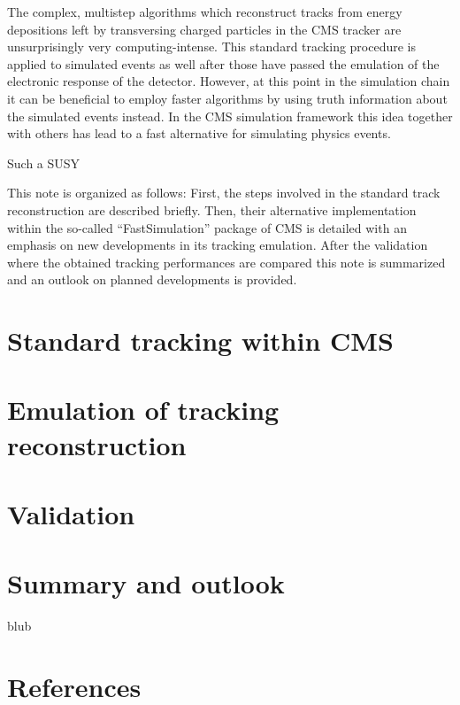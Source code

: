 \documentclass[a4paper]{jpconf}
\begin{document}
The complex, multistep algorithms which reconstruct tracks from energy depositions left by transversing charged particles in the CMS tracker are unsurprisingly very computing-intense. This standard tracking procedure is applied to simulated events as well after those have passed the emulation of the electronic response of the detector. However, at this point in the simulation chain it can be beneficial to employ faster algorithms by using truth information about the simulated events instead. In the CMS simulation framework this idea together with others has lead to a fast alternative for simulating physics events.

Such a SUSY


This note is organized as follows: First, the steps involved in the standard track reconstruction are described briefly. Then, their alternative implementation within the so-called ``FastSimulation'' package of CMS is detailed with an emphasis on new developments in its tracking emulation. After the validation where the obtained tracking performances are compared this note is summarized and an outlook on planned developments is provided.

\section{Standard tracking within CMS}

\section{Emulation of tracking reconstruction}

\section{Validation}

\section{Summary and outlook}

\ack
blub


\section{References}
\end{document}
